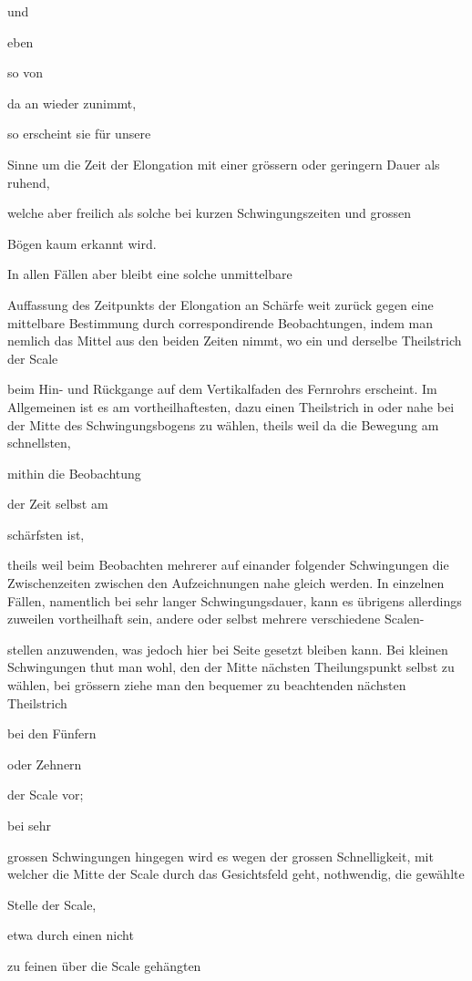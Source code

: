 \documentclass[12pt,a4paper]{article}
\begin{document}
und

eben

so von

da an wieder zunimmt,

so erscheint sie für unsere

Sinne um die Zeit der Elongation mit einer grössern oder geringern Dauer als ruhend,

welche aber freilich als solche bei kurzen Schwingungszeiten und grossen

Bögen kaum erkannt wird.

In allen Fällen aber bleibt eine solche unmittelbare

Auffassung des Zeitpunkts der Elongation an Schärfe weit zurück gegen eine mittelbare Bestimmung durch correspondirende Beobachtungen, indem man nemlich das Mittel aus den beiden Zeiten nimmt, wo ein und derselbe Theilstrich der Scale

beim Hin- und Rückgange auf dem Vertikalfaden des Fernrohrs erscheint. Im Allgemeinen ist es am vortheilhaftesten, dazu einen Theilstrich in oder nahe bei der Mitte des Schwingungsbogens zu wählen, theils weil da die Bewegung am schnellsten,

mithin die Beobachtung

der Zeit selbst am

schärfsten ist,

theils weil beim Beobachten mehrerer auf einander folgender Schwingungen die Zwischenzeiten zwischen den Aufzeichnungen nahe gleich werden. In einzelnen Fällen, namentlich bei sehr langer Schwingungsdauer, kann es übrigens allerdings zuweilen vortheilhaft sein, andere oder selbst mehrere verschiedene Scalen-

stellen anzuwenden, was jedoch hier bei Seite gesetzt bleiben kann. Bei kleinen Schwingungen thut man wohl, den der Mitte nächsten Theilungspunkt selbst zu wählen, bei grössern ziehe man den bequemer zu beachtenden nächsten Theilstrich

bei den Fünfern

oder Zehnern

der Scale vor;

bei sehr

grossen Schwingungen hingegen wird es wegen der grossen Schnelligkeit, mit welcher die Mitte der Scale durch das Gesichtsfeld geht, nothwendig, die gewählte

Stelle der Scale,

etwa durch einen nicht

zu feinen über die Scale gehängten
\end{document}
